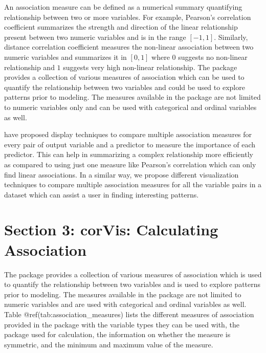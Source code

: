 An association measure can be defined as a numerical summary quantifying
relationship between two or more variables. For example, Pearson's
correlation coefficient summarizes the strength and direction of the
linear relationship present between two numeric variables and is in the
range \([-1,1]\). Similarly, distance correlation coefficient measures
the non-linear association between two numeric variables and summarizes
it in \([0,1]\) where \(0\) suggests no non-linear relationship and
\(1\) suggests very high non-linear relationship. The package provides a
collection of various measures of association which can be used to
quantify the relationship between two variables and could be used to
explore patterns prior to modeling. The measures available in the
package are not limited to numeric variables only and can be used with
categorical and ordinal variables as well.

\citet{kuhn2013applied} have proposed display techniques to compare
multiple association measures for every pair of output variable and a
predictor to measure the importance of each predictor. This can help in
summarizing a complex relationship more efficiently as compared to using
just one measure like Pearson's correlation which can only find linear
associations. In a similar way, we propose different visualization
techniques to compare multiple association measures for all the variable
pairs in a dataset which can assist a user in finding interesting
patterns.

\hypertarget{section-3-corvis-calculating-association}{%
\section{Section 3: corVis: Calculating
Association}\label{section-3-corvis-calculating-association}}

The package  provides a collection of various measures
of association which is used to quantify the relationship between two
variables and is used to explore patterns prior to modeling. The
measures available in the package are not limited to numeric variables
and are used with categorical and ordinal variables as well. Table
@ref(tab:association\_measures) lists the different measures of
association provided in the package with the variable types they can be
used with, the package used for calculation, the information on whether
the measure is symmetric, and the minimum and maximum value of the
measure.

